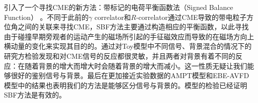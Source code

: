 引入了一个寻找CME的新方法：带标记的电荷平衡函数法（Signed Balance Function） 。不同于此前的$\gamma$ correlator和$R$-correlator通过CME导致的带电粒子方位角之间的关联来寻找CME，SBF方法主要通过构造相应的平衡函数，以此寻找由于碰撞早期旁观者的运动产生的磁场所引起的手征磁效应而导致的在磁场方向上横动量的变化来实现其目的的。通过对Toy模型中不同信号、背景混合的情况下的研究方检验发现\rrest 和\rb 对CME信号的反应都很灵敏，并且两者对背景有着不同的反应：在\rrest 随着背景的增大而增大时\rb 会随着背景的增大而减小。这一性质无疑让我们能够很好的鉴别信号与背景。最后在更加接近实验数据的AMPT模型和EBE-AVFD模型中的结果也表明我们的方法是能够区分信号与背景的。模型的检验已经证明SBF方法是有效的。